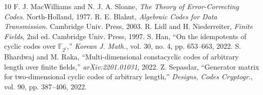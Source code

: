 \documentclass[10pt,twocolumn]{IEEEtran}
\theoremstyle{plain}
\theoremstyle{definition}
\begin{document}
\begin{thebibliography}{10}
 F. J. MacWilliams and N. J. A. Sloane, \emph{The Theory of Error-Correcting Codes}. North-Holland, 1977.
 R. E. Blahut, \emph{Algebraic Codes for Data Transmission}. Cambridge Univ. Press, 2003.
 R. Lidl and H. Niederreiter, \emph{Finite Fields}, 2nd ed. Cambridge Univ. Press, 1997.
 S. Han, ``On the idempotents of cyclic codes over $\mathbb{F}_{2^t}$,'' \emph{Korean J. Math.}, vol. 30, no. 4, pp. 653--663, 2022.
 S. Bhardwaj and M. Raka, ``Multi-dimensional constacyclic codes of arbitrary length over finite fields,'' \emph{arXiv:2201.01031}, 2022.
 Z. Sepasdar, ``Generator matrix for two-dimensional cyclic codes of arbitrary length,'' \emph{Designs, Codes Cryptogr.}, vol. 90, pp. 387--406, 2022.
\end{thebibliography}
\end{document}
